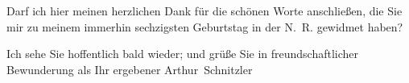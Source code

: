 \pstart
           Darf ich hier meinen herzlichen Dank für die schönen Worte anschließen, die Sie mir zu meinem immerhin
               sechzigsten Geburtstag in der N. R. gewidmet
               haben?\pend
           
\pstart
           Ich sehe Sie hoffentlich bald wieder; und grüße Sie in freundschaftlicher Bewunderung
               als Ihr ergebener \spacefill\mbox{Arthur Schnitzler}\pend
           \endnumbering{}  \newcommand{\dateiname}{L02390}\newcommand{\titel}{Arthur Schnitzler an Thomas Mann, 26. 6. 1922}\newcommand{\editorInnen}{Martin Anton Müller und Gerd-Hermann Susen}
